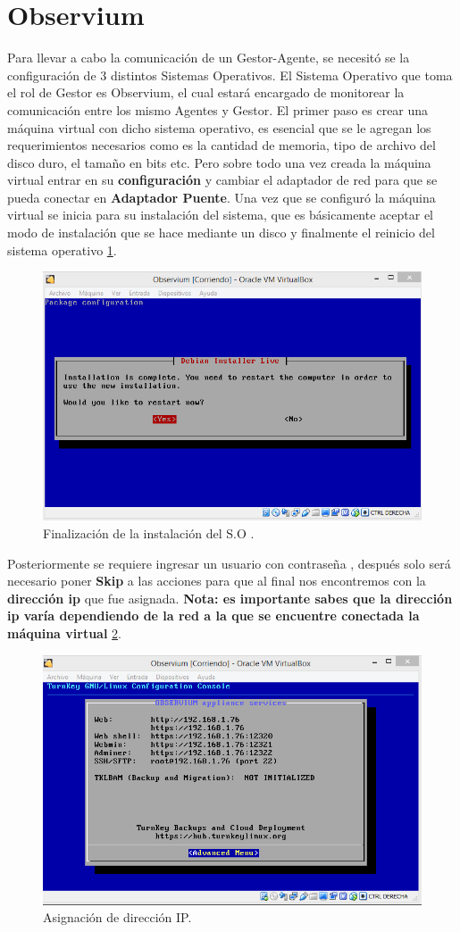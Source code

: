 \documentclass[10pt,a4paper]{book}
\author{Rosa}
\begin{document}
\section{Observium}

Para llevar a cabo la comunicación de un Gestor-Agente, se necesitó se la configuración de 3 distintos Sistemas Operativos. 
El Sistema Operativo que toma el rol de Gestor es Observium, el cual estará encargado de monitorear la comunicación entre los mismo Agentes y Gestor. El primer paso es crear una máquina virtual con dicho sistema operativo, es esencial que se le agregan los requerimientos necesarios como es la cantidad de memoria, tipo de archivo del disco duro, el tamaño en bits etc. Pero sobre todo una vez creada la máquina virtual entrar en su \textbf{configuración} y cambiar el adaptador de red para que se pueda conectar en \textbf{Adaptador Puente}.
Una vez que se configuró la máquina virtual se inicia para su instalación del sistema, que es básicamente aceptar el modo de instalación que se hace mediante un disco y finalmente el reinicio del sistema operativo \ref{image:fin}.

\FloatBarrier
\begin{figure}[htbp!]
		\centering
		    \includegraphics[width=.5 \textwidth]{../images/1-Observium.png}
		\caption{Finalización de la instalación del S.O .}
		\label{image:fin}
\end{figure}
\FloatBarrier

Posteriormente se requiere ingresar un usuario con contraseña , después solo será necesario poner  \textbf{Skip} a las acciones para que al final nos encontremos con la  \textbf{dirección ip} que fue asignada.
 \textbf{Nota: es importante sabes que la dirección ip varía dependiendo de la red a la que se encuentre conectada la máquina virtual} \ref{image:ip}.

\FloatBarrier
\begin{figure}[htbp!]
		\centering
		    \includegraphics[width=.5 \textwidth]{../images/2-Observium.png} 
		\caption{Asignación de dirección IP.}
		\label{image:ip}
\end{figure}
\FloatBarrier
\end{document}
